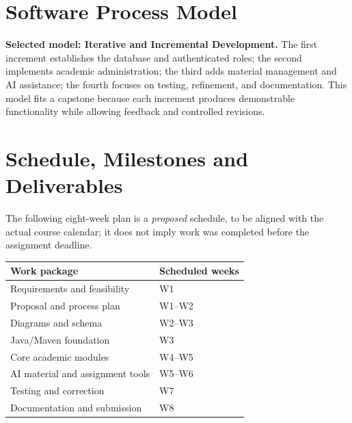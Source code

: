 \documentclass[11pt,a4paper]{article}
\begin{document}
\section{Software Process Model}
\textbf{Selected model: Iterative and Incremental Development.} The first increment establishes the database and authenticated roles; the second implements academic administration; the third adds material management and AI assistance; the fourth focuses on testing, refinement, and documentation. This model fits a capstone because each increment produces demonstrable functionality while allowing feedback and controlled revisions.
\section{Schedule, Milestones and Deliverables}
The following eight-week plan is a \emph{proposed} schedule, to be aligned with the actual course calendar; it does not imply work was completed before the assignment deadline.
\begin{center}\begin{tabular}{p{0.57\textwidth}p{0.29\textwidth}}\toprule Work package&Scheduled weeks\\\midrule
Requirements and feasibility&W1\\
Proposal and process plan&W1--W2\\
Diagrams and schema&W2--W3\\
Java/Maven foundation&W3\\
Core academic modules&W4--W5\\
AI material and assignment tools&W5--W6\\
Testing and correction&W7\\
Documentation and submission&W8\\
\bottomrule\end{tabular}\end{center}
\begin{center}
\begin{adjustbox}{max width=\linewidth}\end{adjustbox}
\end{center}
\end{document}
